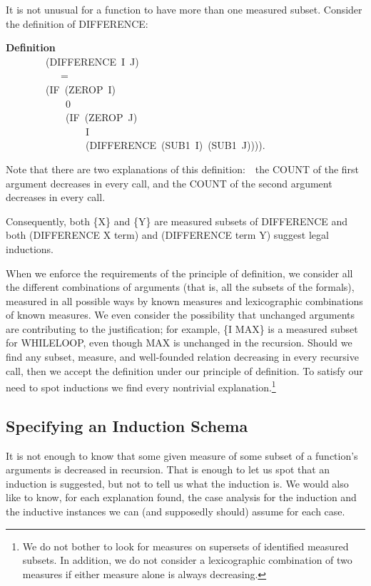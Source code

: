 \documentclass[10pt]{book}
\newenvironment{pubasis}{\begin{flushleft}}{\end{flushleft}}
\newcommand{\axiomordefinition}[1]{\vspace{6pt}\Large\textsf{\textbf{#1}}\normalsize}
\begin{document}
It is not unusual for a function to have more than one measured
subset.  Consider the definition of DIFFERENCE:
\begin{pubasis}
\axiomordefinition{Definition}\\
~~~~~~~~(DIFFERENCE~I~J)\\
~~~~~~~~~~~=\\
~~~~~~~~(IF~(ZEROP~I)\\
~~~~~~~~~~~~0\\
~~~~~~~~~~~~(IF~(ZEROP~J)\\
~~~~~~~~~~~~~~~~I\\
~~~~~~~~~~~~~~~~(DIFFERENCE~(SUB1~I)~(SUB1~J)))).\\
\end{pubasis}
Note that there
are two explanations of this definition:~~the COUNT of the first argument
decreases in every call, and the COUNT of the second argument decreases in every call.

Consequently, both \{X\} and \{Y\} are measured subsets of DIFFERENCE
and  both (DIFFERENCE X term) and (DIFFERENCE term Y) suggest
legal inductions.  

When we enforce the requirements of the principle of definition, we consider all the
different combinations of arguments (that is, all the subsets of
the formals), measured in all possible ways by known measures and
lexicographic combinations of known measures.
We even consider the possibility that unchanged arguments
are contributing to the justification; for example, \{I MAX\} is a measured subset for WHILELOOP,
even though MAX is unchanged in the recursion.  Should we find
any subset, measure, and well-founded relation decreasing in every
recursive call, then we accept the definition under our principle
of definition.
To satisfy our need to spot inductions we find every nontrivial
explanation.\footnote{We do not bother to look for measures on supersets of identified measured subsets.  In addition, we do not consider a lexicographic combination of two measures if either measure alone is always decreasing.}

\subsection{Specifying an Induction Schema}
It is not enough to know that some given measure of some subset of
a function's arguments is decreased in recursion.
That is enough to let us spot that an induction is suggested, but not
to tell us what the induction is.  We would also like to know, for each
explanation found, the case analysis for the induction and the inductive
instances we can (and supposedly should) assume for each case.
\end{document}
